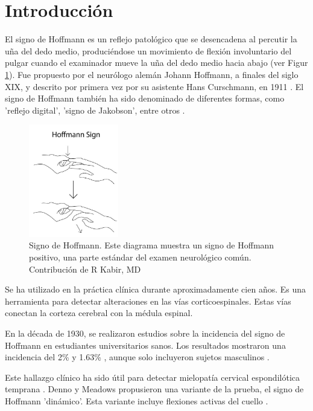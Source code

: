 \section{Introducción}
El signo de Hoffmann es un reflejo patológico que se desencadena al percutir la uña del dedo medio, produciéndose un movimiento de flexión involuntario del pulgar cuando el examinador mueve la uña del dedo medio hacia abajo (ver Figur \ref{fig:Hoffmann_sign}). Fue propuesto por el neurólogo alemán Johann Hoffmann, a finales del siglo XIX, y descrito por primera vez por su asistente Hans Curschmann, en 1911 \cite{BENDHEIM}. El signo de Hoffmann también ha sido denominado de diferentes formas, como 'reflejo digital', 'signo de Jakobson', entre otros \cite{glaser2001cervical}.

\begin{figure}[h!]
	\includegraphics[width=0.35\textwidth]{figures/Kabir_Hoffmann__Sign.jpg}
	\caption{Signo de Hoffmann. Este diagrama muestra un signo de Hoffmann positivo, una parte estándar del examen neurológico común. Contribución de R Kabir, MD\cite{whitney}}
	\label{fig:Hoffmann_sign}
\end{figure}

Se ha utilizado en la práctica clínica durante aproximadamente cien años. Es una herramienta para detectar alteraciones en las vías corticoespinales. Estas vías conectan la corteza cerebral con la médula espinal.\cite{BENDHEIM} \par

En la década de 1930, se realizaron estudios sobre la incidencia del signo de Hoffmann en estudiantes universitarios sanos. Los resultados mostraron una incidencia del 2\% y 1.63\% \cite{echols1936hoffmann} \cite{fay1933clinical}, aunque solo incluyeron sujetos masculinos \cite{glaser2001cervical}. \par

Este hallazgo clínico ha sido útil para detectar mielopatía cervical espondilótica temprana \cite{denno1991early}. Denno y Meadows propusieron una variante de la prueba, el signo de Hoffmann 'dinámico'. Esta variante incluye flexiones activas del cuello \cite{glaser2001cervical}.

